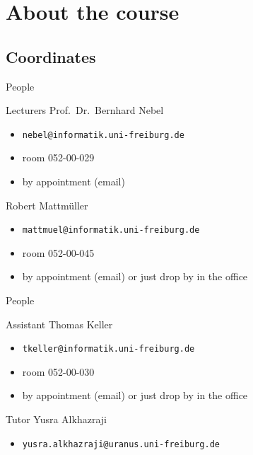 \documentclass{gkibeamer}
\begin{document}
\subtitle{Introduction}
\date{October 25th, 2011}
\maketitles



\section[About\dots]{About the course}

\subsection{Coordinates}

\begin{frame}{People}
  \begin{block}{Lecturers}    
    Prof.~Dr.~Bernhard Nebel
    \begin{itemize}
    \item {} \texttt{nebel@informatik.uni-freiburg.de}
    \item {} room 052-00-029
    \item {} by appointment (email)
    \end{itemize}

    \medskip

    Robert Mattm\"uller
    \begin{itemize}
    \item {} \texttt{mattmuel@informatik.uni-freiburg.de}
    \item {} room 052-00-045
    \item {} by appointment (email)
      or just drop by in the office
    \end{itemize}
  \end{block}
\end{frame}

\begin{frame}{People}
  \begin{block}{Assistant}
    Thomas Keller
    \begin{itemize}
    \item {} \texttt{tkeller@informatik.uni-freiburg.de}
    \item {} room 052-00-030
    \item {} by appointment (email)
      or just drop by in the office
    \end{itemize}
  \end{block}

  \medskip

  \begin{block}{Tutor}
    Yusra Alkhazraji
    \begin{itemize}
    \item {} \texttt{yusra.alkhazraji@uranus.uni-freiburg.de}
    \end{itemize}
  \end{block}
\end{frame}
\end{document}
